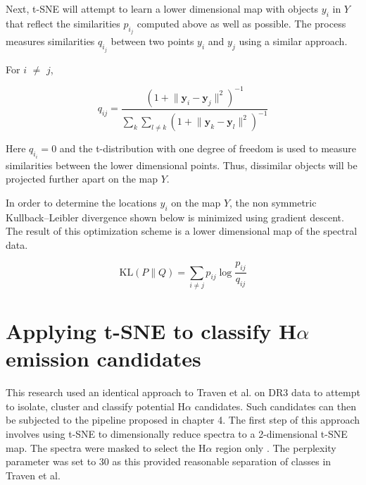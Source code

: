 Next, t-SNE will attempt to learn a lower dimensional map with objects $y_i$ in $Y$ that reflect the similarities $p_i_j$ computed above as well as possible. The process measures similarities $q_i_j$ between two points $y_i$ and $y_j$ using a similar approach. 

For $i$ $\neq$ $j$,

\begin{equation}
    q_{ij}={\frac {(1+\lVert \mathbf {y} _{i}-\mathbf {y} _{j}\rVert ^{2})^{-1}}{\sum _{k}\sum _{l\neq k}(1+\lVert \mathbf {y} _{k}-\mathbf {y} _{l}\rVert ^{2})^{-1}}}
\end{equation}

Here $q_i_i=0$ and the t-distribution with one degree of freedom is used to measure similarities between the lower dimensional points. Thus, dissimilar objects will be projected further apart on the map $Y$.

In order to determine the locations $y_i$ on the map $Y$, the non symmetric Kullback–Leibler divergence shown below is minimized using gradient descent. The result of this optimization scheme is a lower dimensional map of the spectral data.

\begin{equation}
    \mathrm {KL} \left(P\parallel Q\right)=\sum _{i\neq j}p_{ij}\log {\frac {p_{ij}}{q_{ij}}}
\end{equation}

\section{Applying t-SNE to classify H$\alpha$ emission candidates}

This research used an identical approach to Traven et al. on DR3 data to attempt to isolate, cluster and classify potential H$\alpha$ candidates. Such candidates can then be subjected to the pipeline proposed in chapter 4. The first step of this approach involves using t-SNE to dimensionally reduce spectra to a 2-dimensional t-SNE map. The spectra were masked to select the H$\alpha$ region only \cite{traven2017galah}. The perplexity parameter was set to 30 as this provided reasonable separation of classes in Traven et al.

